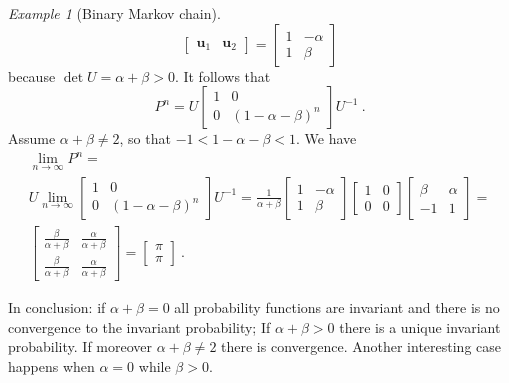 \documentclass[12pt,a4paper]{amsart}
\theoremstyle{plain}%
\theoremstyle{definition}
\theoremstyle{remark}
\newtheorem{example}{Example}
\begin{document}
\begin{example}[Binary Markov chain]
\begin{equation*}
  \begin{bmatrix}
    \bm u_1 & \bm u_2
  \end{bmatrix}
=
  \begin{bmatrix}
    1 & -\alpha \\
    1 & \beta \end{bmatrix}
\end{equation*}
because $\det U = \alpha+\beta > 0$. It follows that
\begin{equation*}
  P^n = U \begin{bmatrix} 1 & 0 \\ 0 & (1-\alpha-\beta)^n
  \end{bmatrix} U^{-1} \ .
\end{equation*}
Assume $\alpha+\beta\neq 2$, so that $-1 < 1-\alpha-\beta < 1$. We have
\begin{multline*}
  \lim_{n\to\infty} P^n = \\ U \lim_{n\to\infty} \begin{bmatrix} 1 & 0 \\ 0 & (1-\alpha-\beta)^n
  \end{bmatrix}U^{-1}  = \frac1{\alpha+\beta} 
\begin{bmatrix}
    1 & -\alpha \\
    1 & \beta \end{bmatrix}
  \begin{bmatrix} 1 & 0 \\ 0 & 0 
  \end{bmatrix}
  \begin{bmatrix}
    \beta & \alpha \\ -1 & 1
  \end{bmatrix} = \\ 
  \begin{bmatrix}
    \frac{\beta}{\alpha+\beta} & \frac{\alpha}{\alpha+\beta} \\ \frac{\beta}{\alpha+\beta} & \frac{\alpha}{\alpha+\beta}
  \end{bmatrix} = 
  \begin{bmatrix}
    \pi \\ \pi 
  \end{bmatrix}
\ .
\end{multline*}

In conclusion: if $\alpha+\beta = 0$ all probability functions are invariant and there is no convergence to the invariant probability; If $\alpha+\beta > 0$ there is a unique invariant probability. If moreover $\alpha+\beta \neq 2$ there is convergence. Another interesting case happens when $\alpha=0$ while $\beta > 0$. 
  
\end{example}
\end{document}
